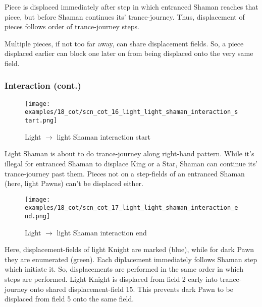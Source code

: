Piece is displaced immediately after step in which entranced Shaman reaches that piece,
but before Shaman continues its' trance-journey. Thus, displacement of pieces follows
order of trance-journey steps.

Multiple pieces, if not too far away, can share displacement fields. So, a piece
displaced earlier can block one later on from being displaced onto the very same
field.

\clearpage %

\subsubsection*{Interaction (cont.)}

\noindent
\begin{figure}[!h]
\texttt{[image: examples/18\_cot/scn\_cot\_16\_light\_light\_shaman\_interaction\_start.png]}
\caption{Light $\rightarrow$ light Shaman interaction start}
\label{fig:scn_cot_16_light_light_shaman_interaction_start}
\end{figure}

Light Shaman is about to do trance-journey along right-hand pattern. While it's illegal
for entranced Shaman to displace King or a Star, Shaman can continue its' trance-journey
past them. Pieces not on a step-fields of an entranced Shaman (here, light Pawns) can't
be displaced either.

\clearpage %

\noindent
\begin{figure}[!h]
\texttt{[image: examples/18\_cot/scn\_cot\_17\_light\_light\_shaman\_interaction\_end.png]}
\caption{Light $\rightarrow$ light Shaman interaction end}
\label{fig:scn_cot_17_light_light_shaman_interaction_end}
\end{figure}

Here, displacement-fields of light Knight are marked (blue), while for dark Pawn they
are enumerated (green). Each diplacement immediately follows Shaman step which initiate
it. So, displacements are performed in the same order in which steps are performed. Light
Knight is displaced from field 2 early into trance-journey onto shared displacement-field
15. This prevents dark Pawn to be displaced from field 5 onto the same field.

